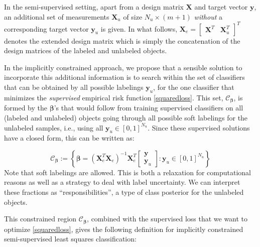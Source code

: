 \documentclass[smallcondensed]{svjour3}
\newcommand{\Xe}{\mathbf{X}_e  }
\newcommand{\XeT}{\mathbf{X}_e^T}
\newcommand{\ye}{\begin{bmatrix} \mathbf{y}  \\ \mathbf{y}_u \end{bmatrix}}
\begin{document}
In the semi-supervised setting, apart from a design matrix $\textbf{X}$ and target vector $\textbf{y}$, an additional set of measurements $\textbf{X}_u$ of size $N_u \times (m+1)$ \emph{without} a corresponding target vector $\textbf{y}_u$ is given. In what follows, $\mathbf{X}_e=\begin{bmatrix} \mathbf{X}^T  & \mathbf{X}_u^T \end{bmatrix}^T$ denotes the extended design matrix which is simply the concatenation of the design matrices of the labeled and unlabeled objects.

In the implicitly constrained approach, we propose that a sensible solution to incorporate this additional information is to search within the set of classifiers that can be obtained by all possible labelings $\textbf{y}_u$, for the one classifier that minimizes the \emph{supervised} empirical risk function \eqref{squaredloss}. This set, $\mathcal{C}_{\boldsymbol{\beta}}$, is formed by the $\boldsymbol{\beta}$'s that would follow from training supervised classifiers on all (labeled and unlabeled) objects going through all possible soft labelings for the unlabeled samples, i.e., using all $\textbf{y}_u \in [0,1]^{N_u}$. Since these supervised solutions have a closed form, this can be written as:

\begin{equation} \label{constrainedregion}
\mathcal{C}_{\boldsymbol{\beta}} := \left\{   \boldsymbol{\beta} = \left( {\XeT} {\Xe} \right)^{-1} {\XeT} \ye: \mathbf{y}_u \in [0,1]^{N_u} \right\}
\end{equation}
Note that soft labelings are allowed. This is both a relaxation for computational reasons as well as a strategy to deal with label uncertainty. We can interpret these fractions as ``responsibilities'', a type of class posterior for the unlabeled objects. 

This constrained region $\mathcal{C}_{\boldsymbol{\beta}}$, combined with the supervised loss that we want to optimize \eqref{squaredloss}, gives the following definition for implicitly constrained semi-supervised least squares classification:
\end{document}
